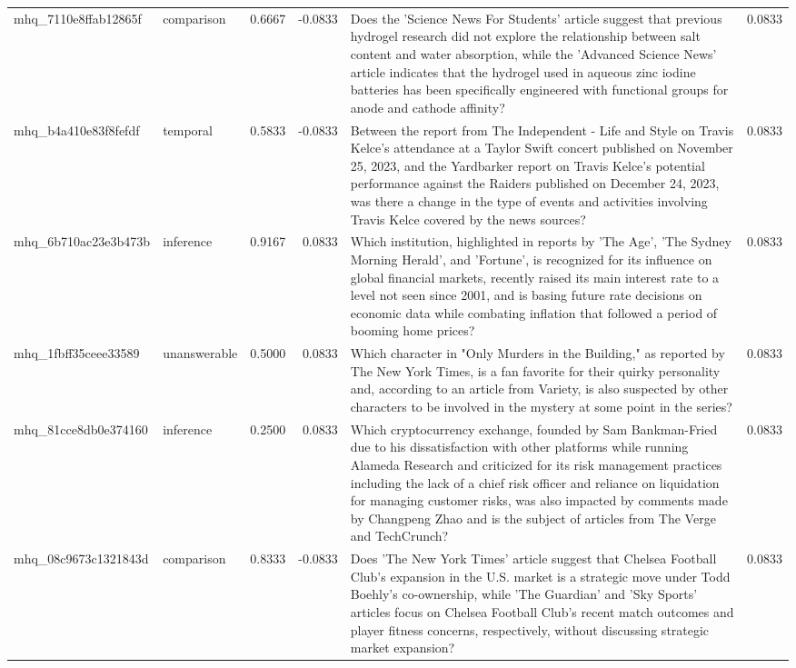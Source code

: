 \begin{tabular}{llrrlr}
mhq_7110e8ffab12865f & comparison & 0.6667 & -0.0833 & Does the 'Science News For Students' article suggest that previous hydrogel research did not explore the relationship between salt content and water absorption, while the 'Advanced Science News' article indicates that the hydrogel used in aqueous zinc iodine batteries has been specifically engineered with functional groups for anode and cathode affinity? & 0.0833 \\
mhq_b4a410e83f8fefdf & temporal & 0.5833 & -0.0833 & Between the report from The Independent - Life and Style on Travis Kelce's attendance at a Taylor Swift concert published on November 25, 2023, and the Yardbarker report on Travis Kelce's potential performance against the Raiders published on December 24, 2023, was there a change in the type of events and activities involving Travis Kelce covered by the news sources? & 0.0833 \\
mhq_6b710ac23e3b473b & inference & 0.9167 & 0.0833 & Which institution, highlighted in reports by 'The Age', 'The Sydney Morning Herald', and 'Fortune', is recognized for its influence on global financial markets, recently raised its main interest rate to a level not seen since 2001, and is basing future rate decisions on economic data while combating inflation that followed a period of booming home prices? & 0.0833 \\
mhq_1fbff35ceee33589 & unanswerable & 0.5000 & 0.0833 & Which character in "Only Murders in the Building," as reported by The New York Times, is a fan favorite for their quirky personality and, according to an article from Variety, is also suspected by other characters to be involved in the mystery at some point in the series? & 0.0833 \\
mhq_81cce8db0e374160 & inference & 0.2500 & 0.0833 & Which cryptocurrency exchange, founded by Sam Bankman-Fried due to his dissatisfaction with other platforms while running Alameda Research and criticized for its risk management practices including the lack of a chief risk officer and reliance on liquidation for managing customer risks, was also impacted by comments made by Changpeng Zhao and is the subject of articles from The Verge and TechCrunch? & 0.0833 \\
mhq_08c9673c1321843d & comparison & 0.8333 & -0.0833 & Does 'The New York Times' article suggest that Chelsea Football Club's expansion in the U.S. market is a strategic move under Todd Boehly's co-ownership, while 'The Guardian' and 'Sky Sports' articles focus on Chelsea Football Club's recent match outcomes and player fitness concerns, respectively, without discussing strategic market expansion? & 0.0833 \\

\end{tabular}
